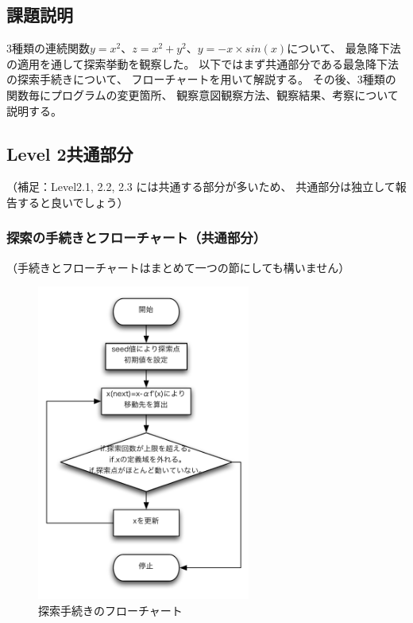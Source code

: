 \subsection{課題説明}
3種類の連続関数$y=x^2$、$z=x^2+y^2$、$y=-x \times sin(x)$について、
最急降下法の適用を通して探索挙動を観察した。
以下ではまず共通部分である最急降下法の探索手続きについて、
フローチャートを用いて解説する。
その後、3種類の関数毎にプログラムの変更箇所、
観察意図観察方法、観察結果、考察について説明する。
\subsection{Level 2共通部分}
（補足：Level2.1, 2.2, 2.3 には共通する部分が多いため、
共通部分は独立して報告すると良いでしょう）

\subsubsection{探索の手続きとフローチャート（共通部分）}
（手続きとフローチャートはまとめて一つの節にしても構いません）
\begin{figure}[htbp]
  \begin{center}
    \includegraphics[clip,width=7.0cm]{./figs/tonal1.pdf}
    \caption{探索手続きのフローチャート}
 \end{center}
\end{figure}
